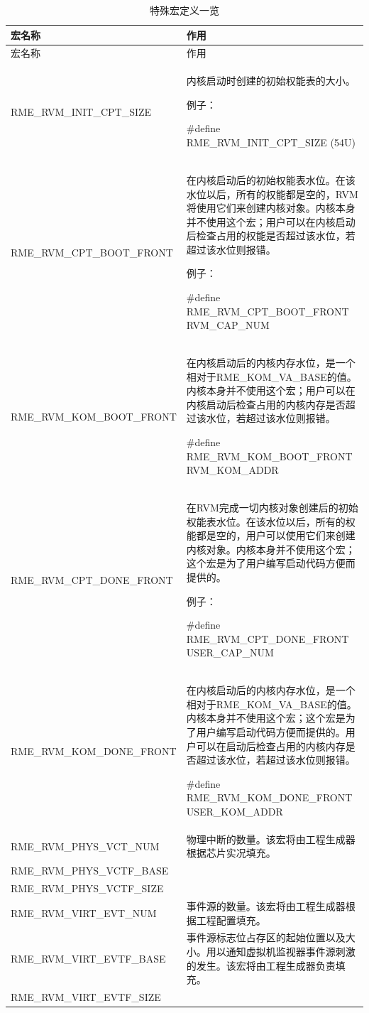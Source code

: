 \begin{xltabular}{\textwidth}{@{}>{\hsize\raggedright\arraybackslash}X>{\hsize\raggedright\arraybackslash}X@{}}
\caption{特殊宏定义一览}\label{tab:7-3-special-macro-definitions-overview}\\
\toprule
宏名称 & 作用\tabularnewline
\endfirsthead
\toprule
宏名称 & 作用\tabularnewline
\midrule
\endhead
\bottomrule
\endlastfoot
RME\_RVM\_INIT\_CPT\_SIZE\strut
 & 内核启动时创建的初始权能表的大小。

例子：

\#define RME\_RVM\_INIT\_CPT\_SIZE (54U)\strut
\tabularnewline
RME\_RVM\_CPT\_BOOT\_FRONT\strut
 & 在内核启动后的初始权能表水位。在该水位以后，所有的权能都是空的，RVM将使用它们来创建内核对象。内核本身并不使用这个宏；用户可以在内核启动后检查占用的权能是否超过该水位，若超过该水位则报错。

例子：

\#define RME\_RVM\_CPT\_BOOT\_FRONT RVM\_CAP\_NUM\strut
\tabularnewline
RME\_RVM\_KOM\_BOOT\_FRONT\strut
 & 在内核启动后的内核内存水位，是一个相对于RME\_KOM\_VA\_BASE的值。内核本身并不使用这个宏；用户可以在内核启动后检查占用的内核内存是否超过该水位，若超过该水位则报错。

\#define RME\_RVM\_KOM\_BOOT\_FRONT RVM\_KOM\_ADDR\strut
\tabularnewline
RME\_RVM\_CPT\_DONE\_FRONT\strut
 & 在RVM完成一切内核对象创建后的初始权能表水位。在该水位以后，所有的权能都是空的，用户可以使用它们来创建内核对象。内核本身并不使用这个宏；这个宏是为了用户编写启动代码方便而提供的。

例子：

\#define RME\_RVM\_CPT\_DONE\_FRONT USER\_CAP\_NUM\strut
\tabularnewline
RME\_RVM\_KOM\_DONE\_FRONT\strut
 & 在内核启动后的内核内存水位，是一个相对于RME\_KOM\_VA\_BASE的值。内核本身并不使用这个宏；这个宏是为了用户编写启动代码方便而提供的。用户可以在启动后检查占用的内核内存是否超过该水位，若超过该水位则报错。

\#define RME\_RVM\_KOM\_DONE\_FRONT USER\_KOM\_ADDR\strut
\tabularnewline
RME\_RVM\_PHYS\_VCT\_NUM &
物理中断的数量。该宏将由工程生成器根据芯片实况填充。\tabularnewline
RME\_RVM\_PHYS\_VCTF\_BASE &
\tabularnewline
RME\_RVM\_PHYS\_VCTF\_SIZE & \rule{0pt}{2\baselineskip}\tabularnewline
RME\_RVM\_VIRT\_EVT\_NUM &
事件源的数量。该宏将由工程生成器根据工程配置填充。\tabularnewline
RME\_RVM\_VIRT\_EVTF\_BASE &
事件源标志位占存区的起始位置以及大小。用以通知虚拟机监视器事件源刺激的发生。该宏将由工程生成器负责填充。\tabularnewline
RME\_RVM\_VIRT\_EVTF\_SIZE &\tabularnewline
\end{xltabular}

